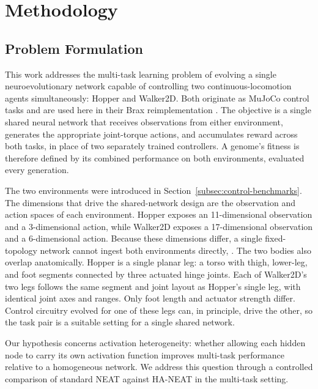 \chapter{Methodology}
\label{sec:methodology}

\section{Problem Formulation}
\label{subsec:problem-formulation}

This work addresses the multi-task learning problem of evolving a single neuroevolutionary network capable of controlling two continuous-locomotion agents simultaneously: Hopper and Walker2D. Both originate as MuJoCo control tasks \parencite{todorov_mujoco_2012,brockman_openai_2016} and are used here in their Brax reimplementation \parencite{freeman_brax_2021}.
The objective is a single shared neural network that receives observations from either environment, generates the appropriate joint-torque actions, and accumulates reward across both tasks, in place of two separately trained controllers.
A genome's fitness is therefore defined by its combined performance on both environments, evaluated every generation.

The two environments were introduced in Section~\ref{subsec:control-benchmarks}. The dimensions that drive the shared-network design are the observation and action spaces of each environment.
Hopper exposes an 11-dimensional observation and a 3-dimensional action, while Walker2D exposes a 17-dimensional observation and a 6-dimensional action.
Because these dimensions differ, a single fixed-topology network cannot ingest both environments directly, .
The two bodies also overlap anatomically.
Hopper is a single planar leg: a torso with thigh, lower-leg, and foot segments connected by three actuated hinge joints.
Each of Walker2D's two legs follows the same segment and joint layout as Hopper's single leg, with identical joint axes and ranges. Only foot length and actuator strength differ.
Control circuitry evolved for one of these legs can, in principle, drive the other, so the task pair is a suitable setting for a single shared network.

Our hypothesis concerns activation heterogeneity: whether allowing each hidden node to carry its own activation function improves multi-task performance relative to a homogeneous network. We address this question through a controlled comparison of standard NEAT against HA-NEAT in the multi-task setting.


